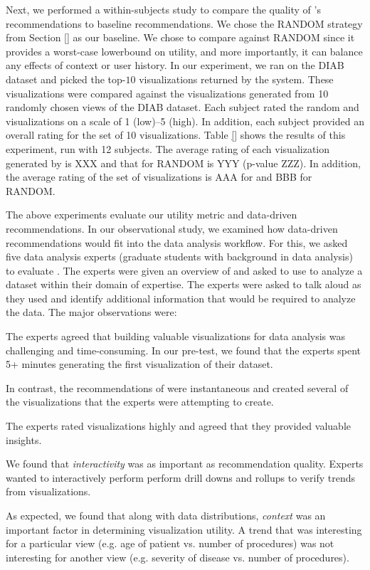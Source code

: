 Next, we performed a within-subjects study to compare the quality of \SeeDB's recommendations to baseline recommendations.
We chose the RANDOM strategy from Section \ref{} as our baseline.
We chose to compare against RANDOM since it provides a worst-case lowerbound on utility, and more importantly, it can balance any effects of context or user history. 
In our experiment, we ran \SeeDB on the DIAB dataset and picked the top-$10$ visualizations returned by the system.
These visualizations were compared against the visualizations 
generated from 10 randomly chosen views of the DIAB dataset. 
Each subject rated the random and \SeeDB visualizations on a scale of 1 (low)--5 (high).
In addition, each subject provided an overall rating for the set of 10 visualizations.
Table \ref{} shows the results of this experiment, run with 12 subjects. 
The average rating of each visualization generated by \SeeDB is
XXX and that for RANDOM is YYY (p-value ZZZ).
In addition, the average rating of the set of visualizations is AAA for \SeeDB and BBB for RANDOM.

The above experiments evaluate our utility metric and data-driven recommendations. 
In our observational study, we examined how data-driven recommendations would fit into the data analysis workflow.
For this, we asked five data analysis experts (graduate students with background in data analysis) to evaluate \SeeDB.
The experts were given an overview of \SeeDB and asked to use \SeeDB to analyze a dataset within their domain of expertise.
The experts were asked to talk aloud as they used \SeeDB and identify additional information that would be required to analyze the data. 
The major observations were:
\begin{denselist}
\item The experts agreed that building valuable visualizations for data analysis was challenging and time-consuming. In our pre-test, we found that the experts spent 5+ minutes generating the first visualization of their dataset.
\item In contrast, the recommendations of \SeeDB were instantaneous and created several of the visualizations that the experts were attempting to create.
\item The experts rated \SeeDB visualizations highly and agreed that they provided valuable insights.
\item We found that {\it interactivity} was as important as recommendation quality. Experts wanted to interactively perform perform drill downs and rollups to verify trends from visualizations.
\item As expected, we found that along with data distributions, {\it context} was an important factor in determining visualization utility. A trend that was interesting for a particular view (e.g. age of patient vs. number of procedures) was not interesting for another view (e.g. severity of disease vs. number of procedures). 
\end{denselist}

